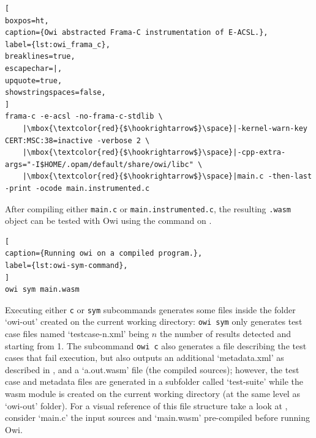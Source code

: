 \begin{lstlisting}[
boxpos=ht,
caption={Owi abstracted Frama-C instrumentation of E-ACSL.},
label={lst:owi_frama_c},
breaklines=true,
escapechar=|,
upquote=true,
showstringspaces=false,
]
frama-c -e-acsl -no-frama-c-stdlib \
    |\mbox{\textcolor{red}{$\hookrightarrow$}\space}|-kernel-warn-key CERT:MSC:38=inactive -verbose 2 \
    |\mbox{\textcolor{red}{$\hookrightarrow$}\space}|-cpp-extra-args="-I$HOME/.opam/default/share/owi/libc" \
    |\mbox{\textcolor{red}{$\hookrightarrow$}\space}|main.c -then-last -print -ocode main.instrumented.c
\end{lstlisting}

After compiling either \lstinline$main.c$ or \lstinline$main.instrumented.c$, the resulting \lstinline$.wasm$ object can be tested with Owi using the command on .

\begin{lstlisting}[
caption={Running owi on a compiled program.},
label={lst:owi-sym-command},
]
owi sym main.wasm
\end{lstlisting}

Executing either \lstinline$c$ or \lstinline$sym$ subcommands generates some files inside the folder `owi-out' created on the current working directory: \lstinline$owi sym$ only generates test case files named `testcase-n.xml' being $n$ the number of results detected and starting from 1. The subcommand \lstinline$owi c$ also generates a file describing the test cases that fail execution, but also outputs an additional `metadata.xml' as described in , and a `a.out.wasm' file (the compiled sources); however, the test case and metadata files are generated in a subfolder called `test-suite' while the \acrlong{wasm} module is created on the current working directory (at the same level as `owi-out' folder).
For a visual reference of this file structure take a look at , consider `main.c' the input sources and `main.wasm' pre-compiled before running Owi.

